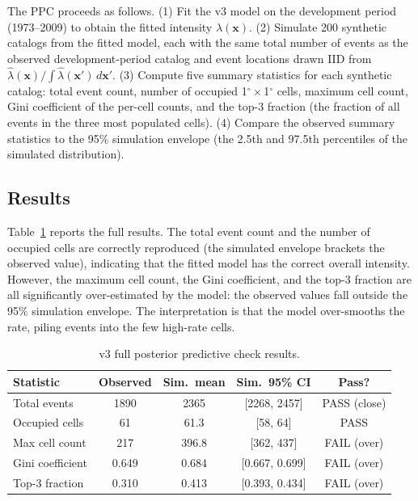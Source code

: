 \documentclass[10pt,a4paper,twocolumn]{article}
\begin{document}
The PPC proceeds as follows. (1) Fit the v3 model on the development period (1973--2009) to obtain the fitted intensity $\hat\lambda(\mathbf{x})$. (2) Simulate 200 synthetic catalogs from the fitted model, each with the same total number of events as the observed development-period catalog and event locations drawn IID from $\hat\lambda(\mathbf{x}) / \int \hat\lambda(\mathbf{x}')\, d\mathbf{x}'$. (3) Compute five summary statistics for each synthetic catalog: total event count, number of occupied 1$^\circ\times$1$^\circ$ cells, maximum cell count, Gini coefficient of the per-cell counts, and the top-3 fraction (the fraction of all events in the three most populated cells). (4) Compare the observed summary statistics to the 95\% simulation envelope (the 2.5th and 97.5th percentiles of the simulated distribution).

\subsection{Results}

Table~\ref{tab:v3-ppc-full} reports the full results. The total event count and the number of occupied cells are correctly reproduced (the simulated envelope brackets the observed value), indicating that the fitted model has the correct overall intensity. However, the maximum cell count, the Gini coefficient, and the top-3 fraction are all significantly over-estimated by the model: the observed values fall outside the 95\% simulation envelope. The interpretation is that the model over-smooths the rate, piling events into the few high-rate cells.

\begin{table}[t]
\centering
\caption{v3 full posterior predictive check results.}\label{tab:v3-ppc-full}
\small
\begin{tabular*}{\columnwidth}{@{\extracolsep{\fill}}lcccc}
\toprule
Statistic & Observed & Sim.\ mean & Sim.\ 95\% CI & Pass? \\
\midrule
Total events          & 1890 & 2365 & [2268, 2457] & PASS (close) \\
Occupied cells        & 61   & 61.3 & [58, 64]     & PASS \\
Max cell count        & 217  & 396.8 & [362, 437] & FAIL (over) \\
Gini coefficient      & 0.649 & 0.684 & [0.667, 0.699] & FAIL (over) \\
Top-3 fraction        & 0.310 & 0.413 & [0.393, 0.434] & FAIL (over) \\
\bottomrule
\end{tabular*}
\end{table}
\end{document}

